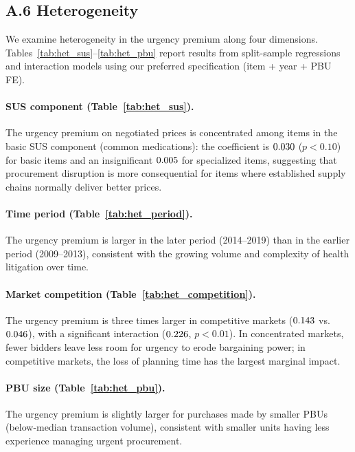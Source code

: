 \subsection*{A.6 Heterogeneity}
\label{sec:appendix_het}

We examine heterogeneity in the urgency premium along four dimensions. Tables~\ref{tab:het_sus}--\ref{tab:het_pbu} report results from split-sample regressions and interaction models using our preferred specification (item + year + PBU FE).


\paragraph{SUS component (Table~\ref{tab:het_sus}).}
The urgency premium on negotiated prices is concentrated among items in the basic SUS component (common medications): the coefficient is $0.030$ ($p < 0.10$) for basic items and an insignificant $0.005$ for specialized items, suggesting that procurement disruption is more consequential for items where established supply chains normally deliver better prices.

\paragraph{Time period (Table~\ref{tab:het_period}).}
The urgency premium is larger in the later period (2014--2019) than in the earlier period (2009--2013), consistent with the growing volume and complexity of health litigation over time.

\paragraph{Market competition (Table~\ref{tab:het_competition}).}
The urgency premium is three times larger in competitive markets ($0.143$ vs.\ $0.046$), with a significant interaction ($0.226$, $p < 0.01$). In concentrated markets, fewer bidders leave less room for urgency to erode bargaining power; in competitive markets, the loss of planning time has the largest marginal impact.

\paragraph{PBU size (Table~\ref{tab:het_pbu}).}
The urgency premium is slightly larger for purchases made by smaller PBUs (below-median transaction volume), consistent with smaller units having less experience managing urgent procurement.

